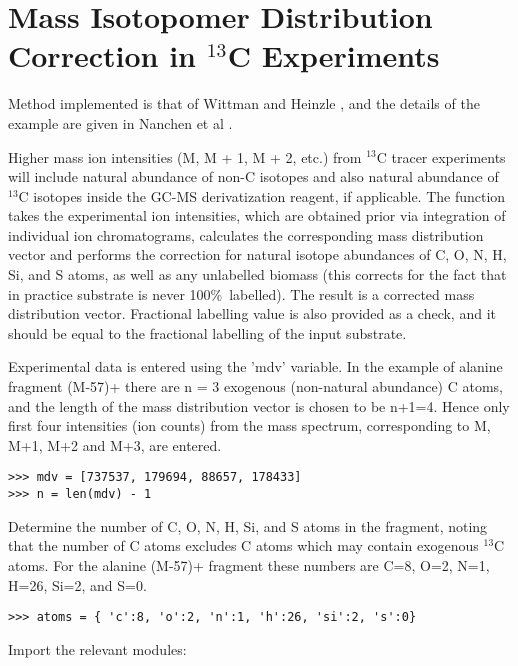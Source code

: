 \section
{Mass Isotopomer Distribution Correction in $^{13}$C Experiments}


Method implemented is that of Wittman and Heinzle \cite{wittman99}, and the details
of the example are given in Nanchen et al \cite{nanchen07}. 

Higher mass ion intensities (M, M + 1, M + 2, etc.) from $^{13}$C tracer 
experiments will include natural abundance of non-C isotopes and also natural 
abundance of $^{13}$C isotopes inside the GC-MS derivatization reagent, if 
applicable. The function takes the experimental ion intensities, which are obtained 
prior via integration of individual ion chromatograms, calculates the corresponding 
mass distribution vector and performs the correction  for natural isotope 
abundances of C, O, N, H, Si, and S atoms, as well as any unlabelled biomass (this 
corrects for the fact that in practice substrate is never 100\%\ labelled). The 
result is a corrected mass distribution vector. Fractional labelling value is also
provided as a check, and it should be equal to the fractional labelling of the
input substrate.

Experimental data is entered using the 'mdv' variable. In the example of
alanine fragment (M-57)+ \cite{nanchen07} there are n = 3 exogenous (non-natural
abundance) C atoms, and the length of the mass distribution vector
is chosen to be n+1=4. Hence only first four intensities (ion counts)
from the mass spectrum, corresponding to M, M+1, M+2 and M+3, are entered.

\begin{verbatim}
>>> mdv = [737537, 179694, 88657, 178433]
>>> n = len(mdv) - 1
\end{verbatim}

Determine the number of C, O, N, H, Si, and S atoms in the fragment,
noting that the number of C atoms excludes C atoms which may contain
exogenous $^{13}$C atoms. For the alanine (M-57)+ fragment these
numbers are C=8, O=2, N=1, H=26, Si=2, and S=0.

\begin{verbatim} 
>>> atoms = { 'c':8, 'o':2, 'n':1, 'h':26, 'si':2, 's':0}
\end{verbatim}

Import the relevant modules:

